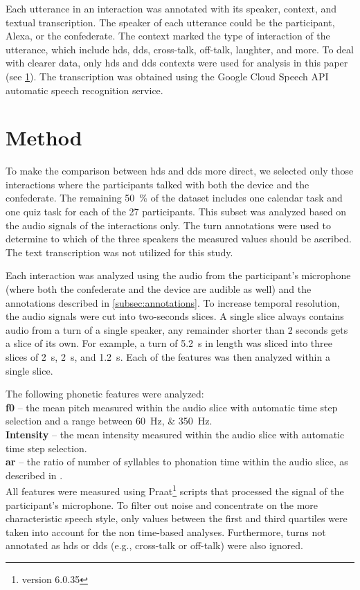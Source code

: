 Each utterance in an interaction was annotated with its speaker, context, and textual transcription.
The speaker of each utterance could be the participant, Alexa, or the confederate.
The context marked the type of interaction of the utterance, which include \ac{hds}, \ac{dds}, cross-talk, off-talk, laughter, and more.
To deal with clearer data, only \ac{hds} and \ac{dds} contexts were used for analysis in this paper (see \cref{sec:method}).
The transcription was obtained using the Google Cloud Speech API automatic speech recognition service.

\section{Method}
\label{sec:method}

To make the comparison between \ac{hds} and \ac{dds} more direct, we selected only those interactions where the participants talked with both the device and the confederate.
The remaining \SI{50}{\percent} of the dataset includes one calendar task and one quiz task for each of the 27 participants.
This subset was analyzed based on the audio signals of the interactions only.
The turn annotations were used to determine to which of the three speakers the measured values should be ascribed.
The text transcription was not utilized for this study.

Each interaction was analyzed using the audio from the participant's microphone (where both the confederate and the device are audible as well) and the annotations described in \cref{subsec:annotations}.
To increase temporal resolution, the audio signals were cut into two-seconds slices.
A single slice always contains audio from a turn of a single speaker, any remainder shorter than \si{2} seconds gets a slice of its own.
For example, a turn of \SI{5.2}{\second} in length was sliced into three slices of \SI{2}{\second}, \SI{2}{\second}, and \SI{1.2}{\second}.
Each of the features was then analyzed within a single slice.

The following phonetic features were analyzed:\\
\textbf{\Acf{f0}} -- the mean pitch measured within the audio slice with automatic time step selection and a range between \SIlist{60;350}{\hertz}.\\
\textbf{Intensity} -- the mean intensity measured within the audio slice with automatic time step selection.\\
\textbf{\Acf{ar}} -- the ratio of number of syllables to phonation time within the audio slice, as described in \citet{DeJong2009arcitulcationrate}.\\
All features were measured using Praat\footnote{version 6.0.35} \citep{Boersma2001praat} scripts that processed the signal of the participant's microphone.
To filter out noise and concentrate on the more characteristic speech style, only values between the first and third quartiles were taken into account for the non time-based analyses.
Furthermore, turns not annotated as \ac{hds} or \ac{dds} (e.g., cross-talk or off-talk) were also ignored.

